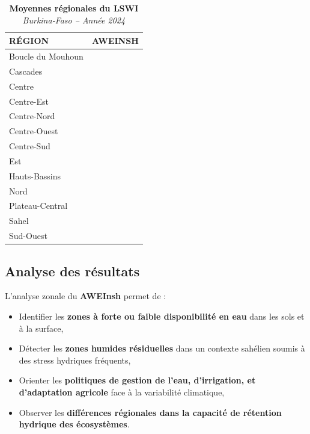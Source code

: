 \documentclass[
]{book}
\providecommand{\tightlist}{%
  \setlength{\itemsep}{0pt}\setlength{\parskip}{0pt}}
\begin{document}
\begin{table}[!t]
\caption*{
{\large \textbf{Moyennes régionales du LSWI}} \\ 
{\small \emph{Burkina-Faso -- Année 2024}}
} 
\fontsize{12.0pt}{14.4pt}\selectfont
\begin{tabular*}{\linewidth}{@{\extracolsep{\fill}}lr}
\toprule
{RÉGION} & {AWEINSH} \\ 
\midrule\addlinespace[2.5pt]
Boucle du Mouhoun & {\cellcolor[HTML]{4795C8}{\textcolor[HTML]{FFFFFF}{-0.277}}} \\ 
Cascades & {\cellcolor[HTML]{F7FBFF}{\textcolor[HTML]{000000}{-0.324}}} \\ 
Centre & {\cellcolor[HTML]{08509A}{\textcolor[HTML]{FFFFFF}{-0.257}}} \\ 
Centre-Est & {\cellcolor[HTML]{95C4DF}{\textcolor[HTML]{000000}{-0.293}}} \\ 
Centre-Nord & {\cellcolor[HTML]{6CAED6}{\textcolor[HTML]{000000}{-0.286}}} \\ 
Centre-Ouest & {\cellcolor[HTML]{08306B}{\textcolor[HTML]{FFFFFF}{-0.247}}} \\ 
Centre-Sud & {\cellcolor[HTML]{084B93}{\textcolor[HTML]{FFFFFF}{-0.255}}} \\ 
Est & {\cellcolor[HTML]{3D8CC3}{\textcolor[HTML]{FFFFFF}{-0.274}}} \\ 
Hauts-Bassins & {\cellcolor[HTML]{D6E6F4}{\textcolor[HTML]{000000}{-0.311}}} \\ 
Nord & {\cellcolor[HTML]{569FCD}{\textcolor[HTML]{FFFFFF}{-0.281}}} \\ 
Plateau-Central & {\cellcolor[HTML]{63A8D3}{\textcolor[HTML]{FFFFFF}{-0.284}}} \\ 
Sahel & {\cellcolor[HTML]{0F58A1}{\textcolor[HTML]{FFFFFF}{-0.259}}} \\ 
Sud-Ouest & {\cellcolor[HTML]{1F6DB2}{\textcolor[HTML]{FFFFFF}{-0.265}}} \\ 
\bottomrule
\end{tabular*}
\end{table}

\subsection{Analyse des résultats}\label{analyse-des-ruxe9sultats-5}

L'analyse zonale du \textbf{AWEInsh} permet de :

\begin{itemize}
\tightlist
\item
  Identifier les \textbf{zones à forte ou faible disponibilité en eau} dans les sols et à la surface,
\item
  Détecter les \textbf{zones humides résiduelles} dans un contexte sahélien soumis à des stress hydriques fréquents,
\item
  Orienter les \textbf{politiques de gestion de l'eau, d'irrigation, et d'adaptation agricole} face à la variabilité climatique,
\item
  Observer les \textbf{différences régionales dans la capacité de rétention hydrique des écosystèmes}.
\end{itemize}
\end{document}
